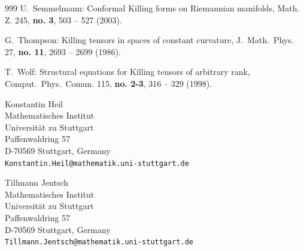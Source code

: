 \documentclass[11pt,a4paper]{article}
\theoremstyle{plain}
\theoremstyle{remark}
\begin{document}
\begin{thebibliography}{999}
 U.~Semmelmann:
\newblock Conformal Killing forms on Riemannian manifolds,
\newblock  Math. Z. 245, {\bf no. 3}, 503 -- 527  (2003).


 G.~Thompson:
\newblock Killing tensors in spaces of constant curvature,
\newblock J.~Math.~Phys. 27, {\bf no. 11}, 2693 -- 2699  (1986).

 T.~Wolf:
\newblock Structural equations for Killing tensors of arbitrary rank,
\newblock Comput.~Phys.~Comun. 115, {\bf no. 2-3}, 316 -- 329  (1998).

\end{thebibliography}

\vspace{2cm}
\begin{center}

 \qquad
 \parbox{60mm}{Konstantin Heil\\
  Mathematisches Institut\\
  Universit{\"a}t zu Stuttgart\\
  Paffenwaldring 57\\
  D-70569 Stuttgart, Germany\\[1mm]
  \texttt{Konstantin.Heil@mathematik.uni-stuttgart.de}}

 \qquad
 \parbox{60mm}{Tillmann Jentsch\\
  Mathematisches Institut\\
  Universit{\"a}t zu Stuttgart\\
  Paffenwaldring 57\\
  D-70569 Stuttgart, Germany\\[1mm]
  \texttt{Tillmann.Jentsch@mathematik.uni-stuttgart.de}}
\end{center}
\end{document}

